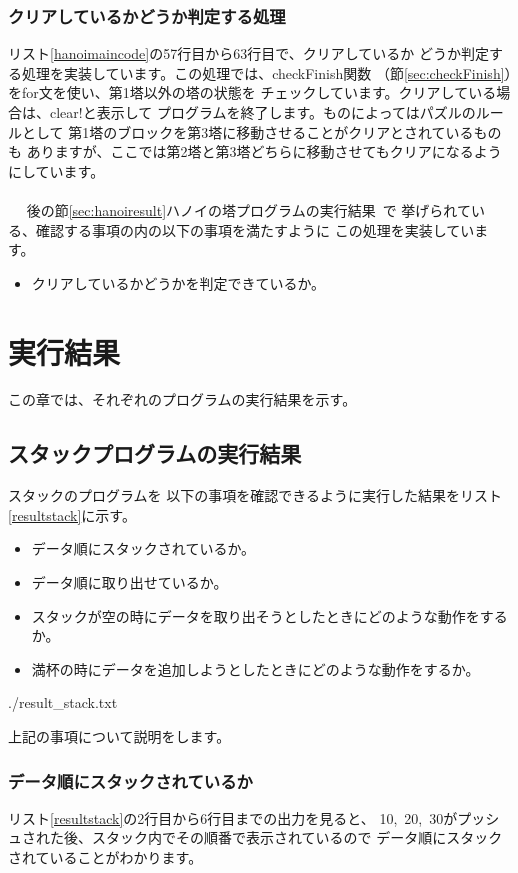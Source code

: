 \documentclass[a4j]{jarticle}
\begin{document}
\subsubsection{クリアしているかどうか判定する処理}
リスト\ref{hanoimaincode}の57行目から63行目で、クリアしているか
どうか判定する処理を実装しています。この処理では、checkFinish関数
（節\ref{sec:checkFinish}）をfor文を使い、第1塔以外の塔の状態を
チェックしています。クリアしている場合は、clear!と表示して
プログラムを終了します。ものによってはパズルのルールとして
第1塔のブロックを第3塔に移動させることがクリアとされているものも
ありますが、ここでは第2塔と第3塔どちらに移動させてもクリアになるよう
にしています。
\\\\~~
後の節\ref{sec:hanoiresult}ハノイの塔プログラムの実行結果~で
挙げられている、確認する事項の内の以下の事項を満たすように
この処理を実装しています。
\begin{itemize}
  \item クリアしているかどうかを判定できているか。
\end{itemize}



\section{実行結果}
この章では、それぞれのプログラムの実行結果を示す。
\subsection{スタックプログラムの実行結果}
\label{sec:stackresult}
スタックのプログラムを
以下の事項を確認できるように実行した結果をリスト\ref{resultstack}に示す。
\begin{itemize}
  \item データ順にスタックされているか。
  \item データ順に取り出せているか。
  \item スタックが空の時にデータを取り出そうとしたときにどのような動作をするか。
  \item 満杯の時にデータを追加しようとしたときにどのような動作をするか。
\end{itemize}

\begin{lstinputlisting}[caption=スタックプログラムの実行結果,label=resultstack]{./result_stack.txt}
\end{lstinputlisting}

上記の事項について説明をします。
\subsubsection{データ順にスタックされているか}
リスト\ref{resultstack}の2行目から6行目までの出力を見ると、
10,~20,~30がプッシュされた後、スタック内でその順番で表示されているので
データ順にスタックされていることがわかります。
\end{document}
